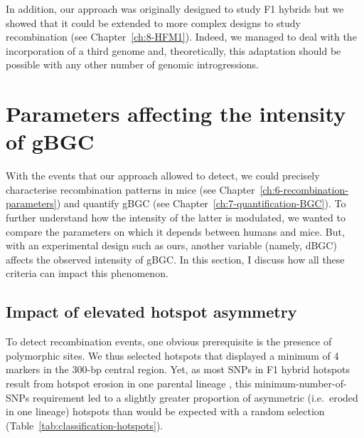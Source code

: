 
In addition, our approach was originally designed to study F1 hybrids but we showed that it could be extended to more complex designs to study recombination (see Chapter~\ref{ch:8-HFM1}).
Indeed, we managed to deal with the incorporation of a third genome and, theoretically, this adaptation should be possible with any other number of genomic introgressions.





\section{Parameters affecting the intensity of gBGC}
\label{chap9:parameters-BGC}

With the events that our approach allowed to detect, we could precisely characterise recombination patterns in mice (see Chapter~\ref{ch:6-recombination-parameters}) and quantify gBGC (see Chapter~\ref{ch:7-quantification-BGC}).
To further understand how the intensity of the latter is modulated, we wanted to compare the parameters on which it depends between humans and mice.
But, with an experimental design such as ours, another variable (namely, dBGC) affects the observed intensity of gBGC\@.
In this section, I discuss how all these criteria can impact this phenomenon.


\subsection{Impact of elevated hotspot asymmetry}

To detect recombination events, one obvious prerequisite is the presence of polymorphic sites.
We thus selected hotspots that displayed a minimum of 4 markers in the 300-bp central region.
Yet, as most SNPs in F1 hybrid hotspots result from hotspot erosion in one parental lineage \citep{smagulova2016evolutionary}, this minimum-number-of-SNPs requirement led to a slightly greater proportion of asymmetric (i.e.\ eroded in one lineage) hotspots than would be expected with a random selection (Table~\ref{tab:classification-hotspots}).

